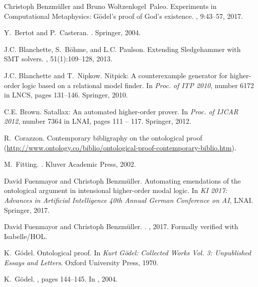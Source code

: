 \documentclass{llncs}
\begin{document}
\begin{thebibliography}{10}
Christoph Benzm{\"u}ller and Bruno Woltzenlogel~Paleo.
\newblock Experiments in {Computational Metaphysics}: {G\"odel's} proof of
  {God's} existence.
, 9:43--57, 2017.

Y.~Bertot and P.~Casteran.
.
\newblock Springer, 2004.

J.C. Blanchette, S.~B\"ohme, and L.C. Paulson.
\newblock Extending {Sledgehammer} with {SMT} solvers.
, 51(1):109--128, 2013.

J.C. Blanchette and T.~Nipkow.
\newblock Nitpick: A counterexample generator for higher-order logic based on a
  relational model finder.
\newblock In {\em Proc. of ITP 2010}, number 6172 in LNCS, pages 131--146.
  Springer, 2010.

C.E. Brown.
\newblock Satallax: An automated higher-order prover.
\newblock In {\em Proc. of IJCAR 2012}, number 7364 in LNAI, pages 111 -- 117.
  Springer, 2012.

R.~Corazzon.
\newblock Contemporary bibligraphy on the ontological proof
  (\url{http://www.ontology.co/biblio/ontological-proof-contemporary-biblio.htm}).

M.~Fitting.
.
\newblock Kluver Academic Press, 2002.

David Fuenmayor and Christoph Benzm{\"u}ller.
\newblock Automating emendations of the ontological argument in intensional
  higher-order modal logic.
\newblock In {\em KI 2017: Advances in Artificial Intelligence 40th Annual
  German Conference on AI}, LNAI. Springer, 2017.

David Fuenmayor and Christoph Benzm\"uller.
.
, 2017.
\newblock Formally verified with Isabelle/HOL.

K.~G\"odel.
\newblock Ontological proof.
\newblock In {\em {Kurt G\"odel: Collected Works Vol. 3: Unpublished Essays and
  Letters}}. Oxford University Press, 1970.

K.~G\"odel.
, pages 144--145.
\newblock In  \cite{sobel2004logic}, 2004.


\end{thebibliography}
\end{document}
